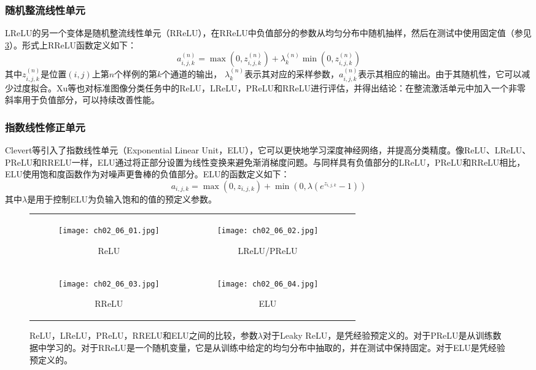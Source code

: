 \subsubsection{随机整流线性单元}\label{RReLU_comp}
LReLU的另一个变体是随机整流线性单元（RReLU）\cite{xu2015ecirical}，在RReLU中负值部分的参数从均匀分布中随机抽样，然后在测试中使用固定值（参见\figurename {\ref{fig:RReLU}}）。形式上RReLU函数定义如下：
\begin{equation}\label{eq:RReLU}
    a^{(n)}_{i,j,k}=\max(0,z^{(n)}_{i,j,k})+\lambda^{(n)}_k\min(0,z^{(n)}_{i,j,k})
\end{equation}
其中$ z^{(n)}_{i,j,k}$是位置$ (i,j) $上第$n$个样例的第$k$个通道的输出， $ \lambda^{(n)}_k $表示其对应的采样参数，$a^{(n)}_{i,j,k}$表示其相应的输出。由于其随机性，它可以减少过度拟合。Xu等\cite{xu2015ecirical}也对标准图像分类任务中的ReLU，LReLU，PReLU和RReLU进行评估，并得出结论：在整流激活单元中加入一个非零斜率用于负值部分，可以持续改善性能。

\subsubsection{指数线性修正单元}
Clevert等\cite{Clevert2015}引入了指数线性单元（Exponential Linear Unit，ELU），它可以更快地学习深度神经网络，并提高分类精度。像ReLU、LReLU、PReLU和RRELU一样，ELU通过将正部分设置为线性变换来避免渐消梯度问题。与同样具有负值部分的LReLU，PReLU和RReLU相比，ELU使用饱和度函数作为对噪声更鲁棒的负值部分。ELU的函数定义如下：
\begin{equation}\label{eq:ELU}
    a_{i,j,k}=\max(0,z_{i,j,k})+\min(0,\lambda(e^{z_{i,j,k}}-1))
\end{equation}
其中$ \lambda $是用于控制ELU为负输入饱和的值的预定义参数。
\begin{figure}
	\centering
	\begin{tabular}[c]{ccc}
		\begin{subfigure}[c]{0.25\textwidth}
			\texttt{[image: ch02\_06\_01.jpg]}
			\caption{ReLU}
			\label{fig:ReLU}
		\end{subfigure}&
		\begin{subfigure}[c]{0.25\textwidth}
			\texttt{[image: ch02\_06\_02.jpg]}
			\caption{LReLU/PReLU}
			\label{fig:PReLU}
		\end{subfigure}\\
		\begin{subfigure}[c]{0.25\textwidth}
			\texttt{[image: ch02\_06\_03.jpg]}
			\caption{RReLU}
			\label{fig:RReLU}	
		\end{subfigure}&
		\begin{subfigure}[c]{0.25\textwidth}
			\texttt{[image: ch02\_06\_04.jpg]}
			\caption{ELU}
			\label{fig:ELU}	
		\end{subfigure}				
	\end{tabular}    
	\caption[各种激活函数比较图]{ReLU，LReLU，PReLU，RRELU和ELU之间的比较，参数$\lambda $对于Leaky ReLU，是凭经验预定义的。对于PReLU是从训练数据中学习的。对于RReLU是一个随机变量，它是从训练中给定的均匀分布中抽取的，并在测试中保持固定。对于ELU是凭经验预定义的。}
	\label{fig:RRELU}
\end{figure}

